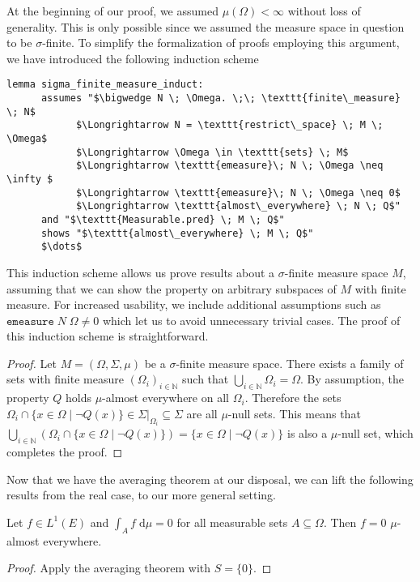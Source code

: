 At the beginning of our proof, we assumed $\mu(\Omega) < \infty$ without loss of generality. This is only possible since we assumed the measure space in question to be $\sigma$-finite. To simplify the formalization of proofs employing this argument, we have introduced the following induction scheme

\begin{isalemma}
{\small
	\begin{lstlisting}[style=isabelle]
	lemma sigma_finite_measure_induct:
	  assumes "$\bigwedge N \; \Omega. \;\; \texttt{finite\_measure} \; N$
			$\Longrightarrow N = \texttt{restrict\_space} \; M \; \Omega$
			$\Longrightarrow \Omega \in \texttt{sets} \; M$
			$\Longrightarrow \texttt{emeasure}\; N \; \Omega \neq \infty $
			$\Longrightarrow \texttt{emeasure}\; N \; \Omega \neq 0$
			$\Longrightarrow \texttt{almost\_everywhere} \; N \; Q$"
	  and "$\texttt{Measurable.pred} \; M \; Q$"
	  shows "$\texttt{almost\_everywhere} \; M \; Q$"
	  $\dots$
	\end{lstlisting}
}
\end{isalemma}

This induction scheme allows us prove results about a $\sigma$-finite measure space $M$, assuming that we can show the property on arbitrary subspaces of $M$ with finite measure. For increased usability, we include additional assumptions such as $\texttt{emeasure}\; N \; \Omega \neq 0$ which let us to avoid unnecessary trivial cases. The proof of this induction scheme is straightforward.
\begin{proof}
Let $M = (\Omega, \Sigma, \mu)$ be a $\sigma$-finite measure space. There exists a family of sets with finite measure $(\Omega_i)_{i \in \mathbb{N}}$ such that $\bigcup_{i \in \mathbb{N}} \Omega_i = \Omega$. By assumption, the property $Q$ holds $\mu$-almost everywhere on all $\Omega_i$. Therefore the sets $\Omega_i \cap \{x \in \Omega \;\vert\; \neg Q(x)\} \in \Sigma\vert_{\Omega_i} \subseteq \Sigma$ are all $\mu$-null sets. This means that $\bigcup_{i \in \mathbb{N}} (\Omega_i \cap \{x \in \Omega \;\vert\; \neg Q(x)\}) = \{x \in \Omega \;\vert\; \neg Q(x)\}$ is also a $\mu$-null set, which completes the proof.
\end{proof}

Now that we have the averaging theorem at our disposal, we can lift the following results from the real case, to our more general setting.

\begin{corollary}
	Let $f \in L^1(E)$ and $\int_A f \;\textrm{d}\mu = 0$ for all measurable sets $A \subseteq \Omega$. Then $f = 0$ $\mu$-almost everywhere. 
\end{corollary}
\begin{proof}
	Apply the averaging theorem with $S = \{0\}$.
\end{proof}


